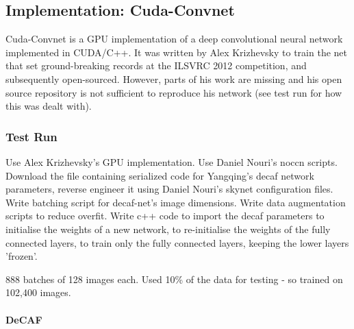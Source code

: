 \documentclass[a4paper,11pt]{article}
\begin{document}
\subsection{Implementation: Cuda-Convnet}

Cuda-Convnet is a GPU implementation of a deep convolutional neural network implemented in CUDA/C++. It was written by Alex Krizhevsky to train the net that set ground-breaking records at the ILSVRC 2012 competition, and subsequently open-sourced. However, parts of his work are missing and his open source repository is not sufficient to reproduce his network (see test run for how this was dealt with).

\subsubsection{Test Run}

Use Alex Krizhevsky's GPU implementation. Use Daniel Nouri's noccn scripts. Download the file containing serialized code for Yangqing's decaf\cite{decaf} network parameters, reverse engineer it using Daniel Nouri's skynet configuration files. Write batching script for decaf-net's image dimensions. Write data augmentation scripts to reduce overfit.  Write c++ code to import the decaf parameters to initialise the weights of a new network, to re-initialise the weights of the fully connected layers, to train only the fully connected layers, keeping the lower layers 'frozen'.

888 batches of 128 images each. Used 10\% of the data for testing - so trained on 102,400 images.

\paragraph{DeCAF}
\end{document}
